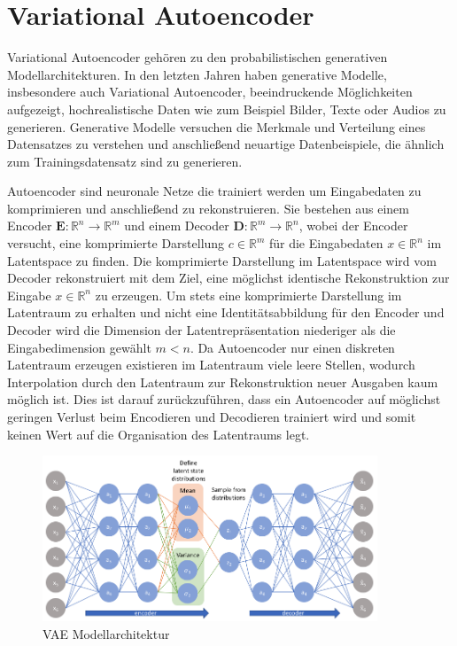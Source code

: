 \section{Variational Autoencoder}\raggedbottom
Variational Autoencoder \citep{kingma2014autoencoding} gehören zu den probabilistischen generativen Modellarchitekturen. In den letzten Jahren haben generative Modelle, insbesondere auch Variational Autoencoder, beeindruckende Möglichkeiten aufgezeigt, hochrealistische Daten wie zum Beispiel Bilder, Texte oder Audios zu generieren.
Generative Modelle versuchen die Merkmale und Verteilung eines Datensatzes zu verstehen und anschließend neuartige Datenbeispiele, die ähnlich zum Trainingsdatensatz sind zu generieren.

Autoencoder sind neuronale Netze die trainiert werden um Eingabedaten zu komprimieren und anschließend zu rekonstruieren. 
Sie bestehen aus einem Encoder $\mathbf{E}:\mathbb{R}^n \rightarrow \mathbb{R}^m$ und einem Decoder $\mathbf{D}:\mathbb{R}^m \rightarrow \mathbb{R}^n$, wobei der Encoder versucht, eine komprimierte Darstellung $c \in \mathbb{R}^{m}$ für die Eingabedaten $x \in \mathbb{R}^{n}$ im Latentspace zu finden. Die komprimierte Darstellung im Latentspace wird vom Decoder rekonstruiert mit dem Ziel, eine möglichst identische Rekonstruktion zur Eingabe $x \in \mathbb{R}^{n}$ zu erzeugen.
Um stets eine komprimierte Darstellung im Latentraum zu erhalten und nicht eine Identitätsabbildung für den Encoder und Decoder wird die Dimension der Latentrepräsentation niederiger als die Eingabedimension gewählt $m<n$. 
Da Autoencoder nur einen diskreten Latentraum erzeugen existieren im Latentraum viele leere Stellen, wodurch Interpolation durch den Latentraum zur Rekonstruktion neuer Ausgaben kaum möglich ist.
Dies ist darauf zurückzuführen, dass ein Autoencoder auf möglichst geringen Verlust beim Encodieren und Decodieren trainiert wird und somit keinen Wert auf die Organisation des Latentraums legt. 


\begin{figure}[h]
    \centering
    \includegraphics[width=10cm]{bilder/vae}
    \caption{VAE Modellarchitektur \citep{jordan_2018}}
    \label{vae_model}
\end{figure}


